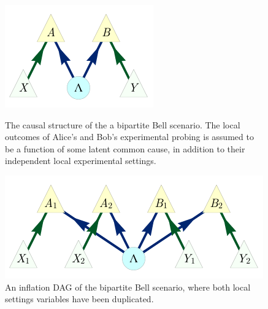 
\begin{figure}[ht]
\centering
\begin{minipage}[t]{0.45\linewidth}
\centering
\includegraphics[scale=1]{BellDagRaw.pdf}
\caption{The causal structure of the a bipartite Bell scenario. The local outcomes of Alice's and Bob's experimental probing is assumed to be a function of some latent common cause, in addition to their independent local experimental settings.}\label{fig:NewBellDAG1}
\end{minipage}
\hfill
\begin{minipage}[t]{0.45\linewidth}
\centering
\includegraphics[scale=1]{BellDagCopy.pdf}
\caption{An inflation DAG of the bipartite Bell scenario, where both local settings variables have been duplicated.}\label{fig:BellDagCopy1}
\end{minipage}
\end{figure}



